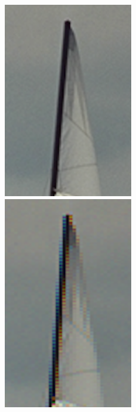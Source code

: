 {\begin{figure}[h]
\begin{center}
       \includegraphics[width=0.5\textwidth]{imagenes/img5_zippering_original.png}
        \caption{}
        \end{center}
\endminipage
{}
\begin{center}
       \includegraphics[width=0.5\textwidth]{imagenes/img5_zippering.png}
        \caption{}
         \end{center}
\endminipage
\end{figure}

}
